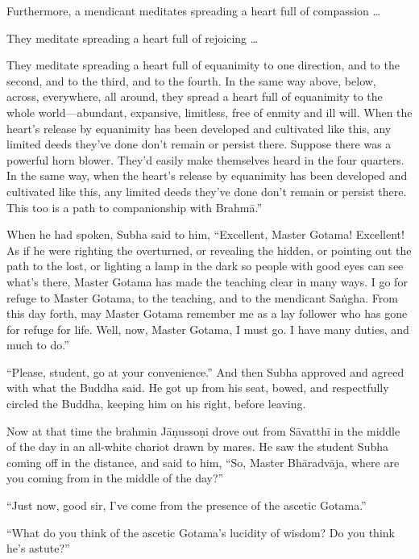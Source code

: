 \documentclass[12pt,openany]{book}%
\begin{document}
Furthermore, a mendicant meditates spreading a heart full of compassion … 

They meditate spreading a heart full of rejoicing … 

They meditate spreading a heart full of equanimity to one direction, and to the second, and to the third, and to the fourth. In the same way above, below, across, everywhere, all around, they spread a heart full of equanimity to the whole world—abundant, expansive, limitless, free of enmity and ill will. When the heart’s release by equanimity has been developed and cultivated like this, any limited deeds they’ve done don’t remain or persist there. Suppose there was a powerful horn blower. They’d easily make themselves heard in the four quarters. In the same way, when the heart’s release by equanimity has been developed and cultivated like this, any limited deeds they’ve done don’t remain or persist there. This too is a path to companionship with \textsanskrit{Brahmā}.” 

When he had spoken, Subha said to him, “Excellent, Master Gotama! Excellent! As if he were righting the overturned, or revealing the hidden, or pointing out the path to the lost, or lighting a lamp in the dark so people with good eyes can see what’s there, Master Gotama has made the teaching clear in many ways. I go for refuge to Master Gotama, to the teaching, and to the mendicant \textsanskrit{Saṅgha}. From this day forth, may Master Gotama remember me as a lay follower who has gone for refuge for life. Well, now, Master Gotama, I must go. I have many duties, and much to do.” 

“Please, student, go at your convenience.” And then Subha approved and agreed with what the Buddha said. He got up from his seat, bowed, and respectfully circled the Buddha, keeping him on his right, before leaving. 

Now at that time the brahmin \textsanskrit{Jāṇussoṇi} drove out from \textsanskrit{Sāvatthī} in the middle of the day in an all-white chariot drawn by mares. He saw the student Subha coming off in the distance, and said to him, “So, Master \textsanskrit{Bhāradvāja}, where are you coming from in the middle of the day?” 

“Just now, good sir, I’ve come from the presence of the ascetic Gotama.” 

“What do you think of the ascetic Gotama’s lucidity of wisdom? Do you think he’s astute?” 
\end{document}
